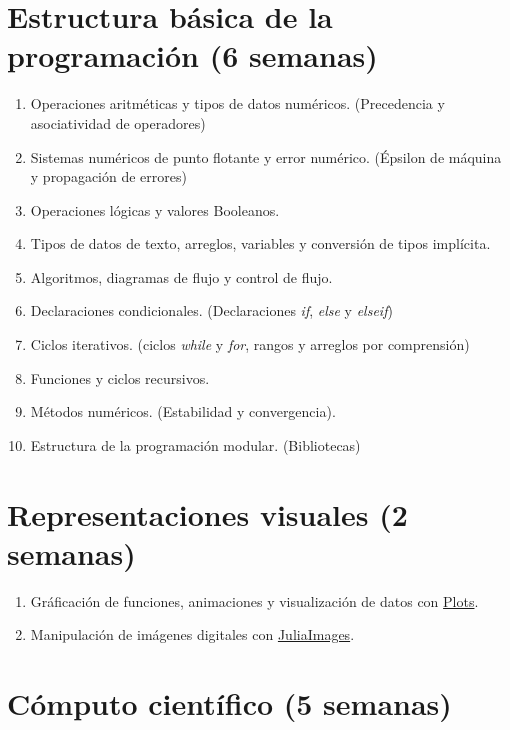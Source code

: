 \documentclass[a4paper]{article}
\begin{document}
\section{Estructura básica de la programación (6 semanas)} \label{Sec: Estructura básica de la programación (3 semanas)}

\begin{enumerate}[label=\arabic*.]

    \item Operaciones aritméticas y tipos de datos numéricos. (Precedencia y asociatividad de operadores)
    \item Sistemas numéricos de punto flotante y error numérico. (Épsilon de máquina y propagación de errores)
    \item Operaciones lógicas y valores Booleanos.
    \item Tipos de datos de texto, arreglos, variables y conversión de tipos implícita.
    \item Algoritmos, diagramas de flujo y control de flujo.
    \item Declaraciones condicionales. (Declaraciones \emph{if}, \emph{else} y \emph{elseif})
    \item Ciclos iterativos. (ciclos \emph{while} y \emph{for}, rangos y arreglos por comprensión) 
    \item Funciones y ciclos recursivos.
    \item Métodos numéricos. (Estabilidad y convergencia).
    \item Estructura de la programación modular. (Bibliotecas)
\end{enumerate}

\section{Representaciones visuales (2 semanas)} \label{Sec: Representaciones visuales (2 semanas)}

\begin{enumerate}[label=\arabic*.]

    \item Gráficación de funciones, animaciones y visualización de datos  con \href{https://docs.juliaplots.org/latest/}{Plots}.
    \item Manipulación de imágenes digitales con \href{https://juliaimages.org/latest/}{JuliaImages}.
\end{enumerate}

\section{Cómputo científico (5 semanas)} \label{Sec: Cómputo científico: construcción de pseudocódigo e implementación en código (8 semanas)}
\end{document}
